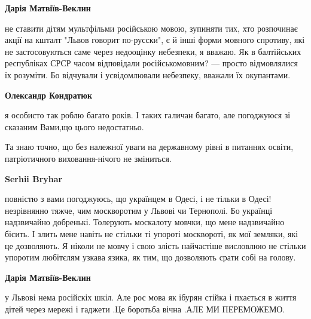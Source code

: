 \begin{itemize}
\begin{itemize}
\textbf{Дарія Матвіїв-Веклин} 

не ставити дітям мультфільми російською мовою, зупиняти тих, хто розпочинає
акції на кшталт "Львов говорит по-русски", є й інші форми мовного спротиву, які
не застосовуються саме через недооцінку небезпеки, я вважаю. Як в балтійських
республіках СРСР часом відповідали російськомовним? — просто відмовлялися їх
розуміти. Бо відчували і усвідомлювали небезпеку, вважали їх окупантами.


 
\textbf{Олександр Кондратюк} 

я особисто так роблю багато років. І таких галичан багато, але погоджуюся зі
сказаним Вами,що цього недостатньо.

Та знаю точно, що без належної уваги на державному рівні в питаннях освіти,
патріотичного виховання-нічого не зміниться.

 
\textbf{Serhii Bryhar} 

повністю з вами погоджуюсь, що українцем в Одесі, і не тільки в Одесі!
незрівнянно тяжче, чим москворотим у Львові чи Тернополі. Бо українці
надзвичайно добренькі. Толерують москалоту мовчки, що мене надзвичайно бісить.
І злить мене навіть не стільки ті упороті москвороті, як мої земляки, які це
дозволяють. Я ніколи не мовчу і свою злість найчастіше висловлюю не стільки
упоротим любітєлям узкава язика, як тим, що дозволяють срати собі на голову.


 
\textbf{Дарія Матвіїв-Веклин} 

у Львові нема російскіх шкіл. Але рос мова як ібурян стійка і пхається в життя
дітей через мережі і гаджети .Це боротьба вічна .АЛЕ МИ ПЕРЕМОЖЕМО.


\end{itemize}
\end{itemize}
